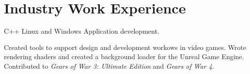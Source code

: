 \documentclass[oneside, 10pt]{memoir}
\begin{document}
\section*{Industry Work Experience}
\begin{adjustwidth}{1em}{0em}%
     {
        C++ Linux and Windows Application development.
    }

     {
        Created tools to support design and development workows in video games. Wrote rendering shaders and created 
        a background loader for the Unreal Game Engine. Contributed to \emph{Gears of War 3: Ultimate Edition} and 
        \emph{Gears of War 4}.
    }


\end{adjustwidth}
\end{document}
